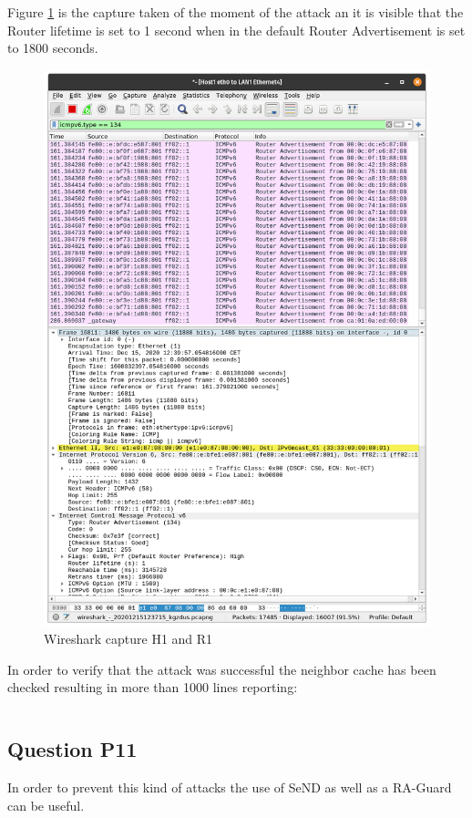Figure \ref{fig:router26_H1_R1} is the capture taken of the moment of the attack an it is visible that the Router lifetime is set to 1 second when in the default Router Advertisement is set to 1800 seconds.

\begin{figure}[H]
	\centering
	\includegraphics[width=\linewidth]{images/P10_SLAAC_DoS.png}
	\caption{Wireshark capture H1 and R1}
	\label{fig:router26_H1_R1}
\end{figure}

In order to verify that the attack was successful the neighbor cache has been checked resulting in more than 1000 lines reporting:

\inputminted{text}{files/P10_ip_neighbor.txt}
\label{log:P10_neighbor_chache}


\subsection{Question P11}
 In order to prevent this kind of attacks the use of SeND as well as a RA-Guard can be useful.

